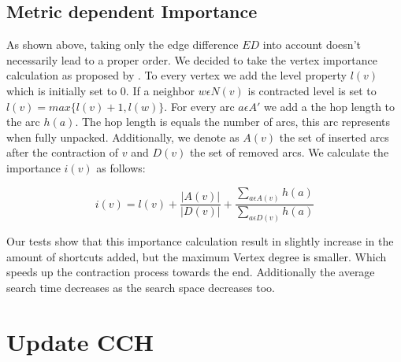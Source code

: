 \subsection{Metric dependent Importance}\label{sec:metric_dependent_importance}

As shown above, taking only the edge difference $ED$ into account doesn't necessarily lead to a proper order.
We decided to take the vertex importance calculation as proposed by \cite[Customization Contraction Hierarchies]{CCH}.
To every vertex we add the level property $l(v)$ which is initially set to $0$.
If a neighbor $w \epsilon N(v)$ is contracted level is set to $l(v) = max\{l(v)+1, l(w)\}$.
For every arc $a \epsilon A'$ we add a the hop length to the arc $h(a)$.
The hop length is equals the number of arcs, this arc represents when fully unpacked.
Additionally, we denote as $A(v)$ the set of inserted arcs after the contraction of $v$ and $D(v)$ the set of removed arcs.
We calculate the importance $i(v)$ as follows:

\begin{equation}
    \label{eq:importance}
    i(v) = l(v) + \frac{|A(v)|}{|D(v)|} + \frac{\sum_{a \epsilon A(v)} h(a)}{\sum_{a \epsilon D(v)} h(a)} 
\end{equation}

Our tests show that this importance calculation result in slightly increase in the amount of shortcuts added, but the maximum Vertex degree is smaller.
Which speeds up the contraction process towards the end.
Additionally the average search time decreases as the search space decreases too.


% 

\section{Update CCH}



